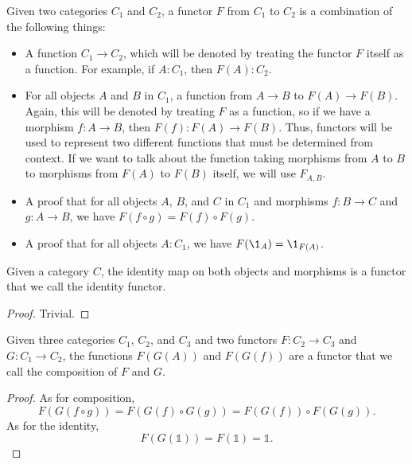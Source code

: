 \documentclass[../../math.tex]{subfiles}
\begin{document}
\begin{definition}
    Given two categories $C_1$ and $C_2$, a functor $F$ from $C_1$ to $C_2$ is a
    combination of the following things:
    \begin{itemize}
        \item A function $C_1 \to C_2$, which will be denoted by treating the
            functor $F$ itself as a function.  For example, if $A : C_1$, then
            $F(A) : C_2$.
        \item For all objects $A$ and $B$ in $C_1$, a function from $A \to B$ to
            $F(A) \to F(B)$.  Again, this will be denoted by treating $F$ as a
            function, so if we have a morphism $f : A \to B$, then $F(f) : F(A)
            \to F(B)$.  Thus, functors will be used to represent two different
            functions that must be determined from context.  If we want to talk
            about the function taking morphisms from $A$ to $B$ to morphisms
            from $F(A)$ to $F(B)$ itself, we will use $F_{A,B}$.
        \item A proof that for all objects $A$, $B$, and $C$ in $C_1$ and
            morphisms $f : B \to C$ and $g : A \to B$, we have $F(f \circ g) =
            F(f) \circ F(g)$.
        \item A proof that for all objects $A : C_1$, we have $F(\1_A) =
            \1_{F(A)}$.
    \end{itemize}
\end{definition}

\begin{theorem}
    Given a category $C$, the identity map on both objects and morphisms is a
    functor that we call the identity functor.
\end{theorem}
\begin{proof}
    Trivial.
\end{proof}

\begin{theorem}
    Given three categories $C_1$, $C_2$, and $C_3$ and two functors $F : C_2 \to
    C_3$ and $G : C_1 \to C_2$, the functions $F(G(A))$ and $F(G(f))$ are a
    functor that we call the composition of $F$ and $G$.
\end{theorem}
\begin{proof}
    As for composition,
    \[
        F(G(f \circ g)) = F(G(f) \circ G(g)) = F(G(f)) \circ F(G(g)).
    \]
    As for the identity,
    \[
        F(G(\mathds 1)) = F(\mathds 1) = \mathds 1.
    \]
\end{proof}
\end{document}
